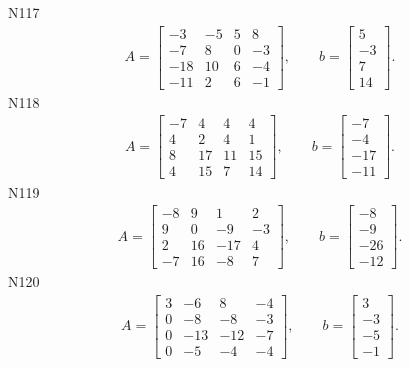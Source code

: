 \documentclass[11pt]{report}
\begin{document}
N117
\begin{align*}
 A = \left[\begin{matrix}-3 & -5 & 5 & 8\\-7 & 8 & 0 & -3\\-18 & 10 & 6 & -4\\-11 & 2 & 6 & -1\end{matrix}\right],
\qquad b = \left[\begin{matrix}5\\-3\\7\\14\end{matrix}\right]. 
 \end{align*}
N118
\begin{align*}
 A = \left[\begin{matrix}-7 & 4 & 4 & 4\\4 & 2 & 4 & 1\\8 & 17 & 11 & 15\\4 & 15 & 7 & 14\end{matrix}\right],
\qquad b = \left[\begin{matrix}-7\\-4\\-17\\-11\end{matrix}\right]. 
 \end{align*}
N119
\begin{align*}
 A = \left[\begin{matrix}-8 & 9 & 1 & 2\\9 & 0 & -9 & -3\\2 & 16 & -17 & 4\\-7 & 16 & -8 & 7\end{matrix}\right],
\qquad b = \left[\begin{matrix}-8\\-9\\-26\\-12\end{matrix}\right]. 
 \end{align*}
N120
\begin{align*}
 A = \left[\begin{matrix}3 & -6 & 8 & -4\\0 & -8 & -8 & -3\\0 & -13 & -12 & -7\\0 & -5 & -4 & -4\end{matrix}\right],
\qquad b = \left[\begin{matrix}3\\-3\\-5\\-1\end{matrix}\right]. 
 \end{align*}
\end{document}
